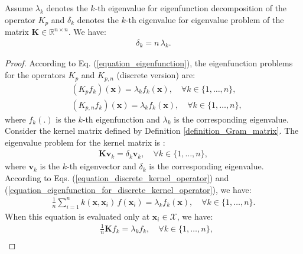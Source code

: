 \documentclass[lang=cn,10pt]{gorgeousnbook}
\numberwithin{equation}{section}%
\numberwithin{figure}{section}%
\begin{document}
\begin{lemma}
Assume $\lambda_k$ denotes the $k$-th eigenvalue for eigenfunction decomposition of the operator $K_p$ and $\delta_k$ denotes the $k$-th eigenvalue for eigenvalue problem of the matrix $\boldsymbol{K} \in \mathbb{R}^{n \times n}$. We have:
\begin{align}\label{equation_connection_eigenvalues_for_kernel_operator}
\delta_k = n\, \lambda_k.
\end{align}
\end{lemma}
\begin{proof}
According to Eq. (\ref{equation_eigenfunction}), the eigenfunction problems for the operators $K_p$ and $K_{p,n}$ (discrete version) are:
\begin{equation}\label{equation_eigenfunction_for_discrete_kernel_operator}
\begin{aligned}
&(K_p f_k)(\boldsymbol{x}) = \lambda_k f_k(\boldsymbol{x}), \quad \forall k \in \{1, \dots, n\}, \\
&(K_{p,n} f_k)(\boldsymbol{x}) = \lambda_k f_k(\boldsymbol{x}), \quad \forall k \in \{1, \dots, n\}, 
\end{aligned}
\end{equation}
where $f_k(.)$ is the $k$-th eigenfunction and $\lambda_k$ is the corresponding eigenvalue.
Consider the kernel matrix defined by Definition \ref{definition_Gram_matrix}.
The eigenvalue problem for the kernel matrix is \cite{ghojogh2019eigenvalue}: 
\begin{align}\label{equation_eigenvalue_problem_kernel_operator}
\boldsymbol{K} \boldsymbol{v}_k = \delta_k \boldsymbol{v}_k, \quad \forall k \in \{1, \dots, n\},
\end{align}
where $\boldsymbol{v}_k$ is the $k$-th eigenvector and $\delta_k$ is the corresponding eigenvalue. 
According to Eqs. (\ref{equation_discrete_kernel_operator}) and (\ref{equation_eigenfunction_for_discrete_kernel_operator}), we have:
\begin{align*}
\frac{1}{n} \sum_{i=1}^n k(\boldsymbol{x},\boldsymbol{x}_i)\, f(\boldsymbol{x}_i) = \lambda_k f_k(\boldsymbol{x}), \quad \forall k \in \{1, \dots, n\}.
\end{align*}
When this equation is evaluated only at $\boldsymbol{x}_i \in \mathcal{X}$, we have:
\begin{align*}
&\frac{1}{n} \boldsymbol{K} f_k = \lambda_k f_k, \quad \forall k \in \{1, \dots, n\}, \\

\end{align*}
\end{proof}
\end{document}
